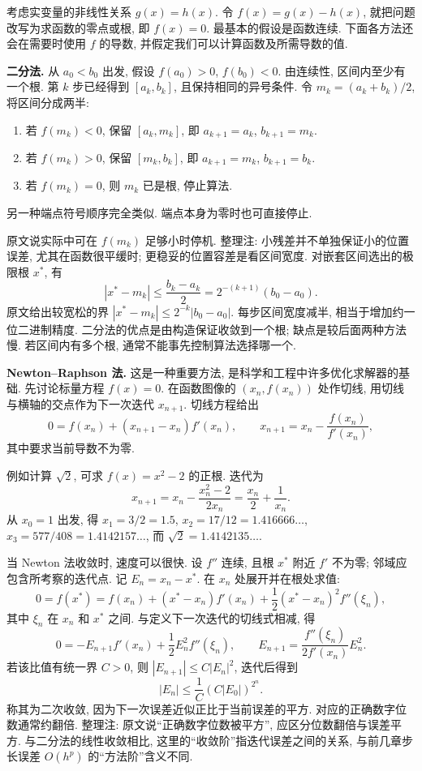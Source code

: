 \label{ch:nonlinear}


考虑实变量的非线性关系 $g(x)=h(x)$. 令 $f(x)=g(x)-h(x)$, 就把问题改写为求函数的零点或根, 即 $f(x)=0$. 最基本的假设是函数连续. 下面各方法还会在需要时使用 $f$ 的导数, 并假定我们可以计算函数及所需导数的值.

\textbf{二分法.} 从 $a_0<b_0$ 出发, 假设 $f(a_0)>0$, $f(b_0)<0$. 由连续性, 区间内至少有一个根. 第 $k$ 步已经得到 $[a_k,b_k]$, 且保持相同的异号条件. 令 $m_k=(a_k+b_k)/2$, 将区间分成两半:
\begin{enumerate}
\item 若 $f(m_k)<0$, 保留 $[a_k,m_k]$, 即 $a_{k+1}=a_k$, $b_{k+1}=m_k$.
\item 若 $f(m_k)>0$, 保留 $[m_k,b_k]$, 即 $a_{k+1}=m_k$, $b_{k+1}=b_k$.
\item 若 $f(m_k)=0$, 则 $m_k$ 已是根, 停止算法.
\end{enumerate}
另一种端点符号顺序完全类似. 端点本身为零时也可直接停止.

原文说实际中可在 $f(m_k)$ 足够小时停机. 整理注: 小残差并不单独保证小的位置误差, 尤其在函数很平缓时; 更稳妥的位置容差是看区间宽度. 对嵌套区间选出的极限根 $x^*$, 有
\[
|x^*-m_k|\leq\frac{b_k-a_k}{2}=2^{-(k+1)}(b_0-a_0).
\]
原文给出较宽松的界 $|x^*-m_k|\leq2^{-k}|b_0-a_0|$. 每步区间宽度减半, 相当于增加约一位二进制精度. 二分法的优点是由构造保证收敛到一个根; 缺点是较后面两种方法慢. 若区间内有多个根, 通常不能事先控制算法选择哪一个.

\textbf{Newton--Raphson 法.} 这是一种重要方法, 是科学和工程中许多优化求解器的基础. 先讨论标量方程 $f(x)=0$. 在函数图像的 $(x_n,f(x_n))$ 处作切线, 用切线与横轴的交点作为下一次迭代 $x_{n+1}$. 切线方程给出
\[
0=f(x_n)+(x_{n+1}-x_n)f'(x_n),\qquad
x_{n+1}=x_n-\frac{f(x_n)}{f'(x_n)},
\]
其中要求当前导数不为零.

例如计算 $\sqrt2$, 可求 $f(x)=x^2-2$ 的正根. 迭代为
\[
x_{n+1}=x_n-\frac{x_n^2-2}{2x_n}=\frac{x_n}{2}+\frac1{x_n}.
\]
从 $x_0=1$ 出发, 得 $x_1=3/2=1.5$, $x_2=17/12=1.416666\ldots$, $x_3=577/408=1.4142157\ldots$, 而 $\sqrt2=1.4142135\ldots$.

当 Newton 法收敛时, 速度可以很快. 设 $f''$ 连续, 且根 $x^*$ 附近 $f'$ 不为零; 邻域应包含所考察的迭代点. 记 $E_n=x_n-x^*$. 在 $x_n$ 处展开并在根处求值:
\[
0=f(x^*)=f(x_n)+(x^*-x_n)f'(x_n)+\frac12(x^*-x_n)^2f''(\xi_n),
\]
其中 $\xi_n$ 在 $x_n$ 和 $x^*$ 之间. 与定义下一次迭代的切线式相减, 得
\[
0=-E_{n+1}f'(x_n)+\frac12E_n^2f''(\xi_n),\qquad
E_{n+1}=\frac{f''(\xi_n)}{2f'(x_n)}E_n^2.
\]
若该比值有统一界 $C>0$, 则 $|E_{n+1}|\leq C|E_n|^2$, 迭代后得到
\begin{equation}\label{eq:newton-double-exponential}
|E_n|\leq\frac1C(C|E_0|)^{2^n}.
\end{equation}
称其为二次收敛, 因为下一次误差近似正比于当前误差的平方. 对应的正确数字位数通常约翻倍. 整理注: 原文说“正确数字位数被平方”, 应区分位数翻倍与误差平方. 与二分法的线性收敛相比, 这里的“收敛阶”指迭代误差之间的关系, 与前几章步长误差 $O(h^p)$ 的“方法阶”含义不同.

